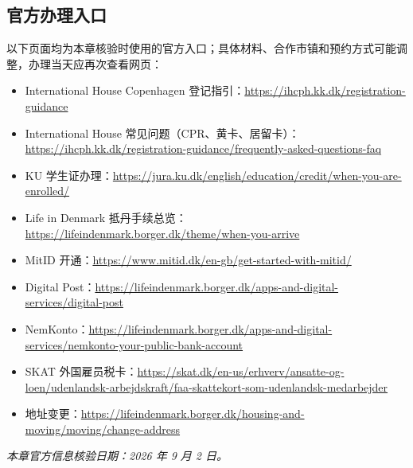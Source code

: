 \subsection{官方办理入口}

以下页面均为本章核验时使用的官方入口；具体材料、合作市镇和预约方式可能调整，办理当天应再次查看网页：

\begin{itemize}[leftmargin=2em,itemsep=2pt]
  \item International House Copenhagen 登记指引：\url{https://ihcph.kk.dk/registration-guidance}
  \item International House 常见问题（CPR、黄卡、居留卡）：\url{https://ihcph.kk.dk/registration-guidance/frequently-asked-questions-faq}
  \item KU 学生证办理：\url{https://jura.ku.dk/english/education/credit/when-you-are-enrolled/}
  \item Life in Denmark 抵丹手续总览：\url{https://lifeindenmark.borger.dk/theme/when-you-arrive}
  \item MitID 开通：\url{https://www.mitid.dk/en-gb/get-started-with-mitid/}
  \item Digital Post：\url{https://lifeindenmark.borger.dk/apps-and-digital-services/digital-post}
  \item NemKonto：\url{https://lifeindenmark.borger.dk/apps-and-digital-services/nemkonto-your-public-bank-account}
  \item SKAT 外国雇员税卡：\url{https://skat.dk/en-us/erhverv/ansatte-og-loen/udenlandsk-arbejdskraft/faa-skattekort-som-udenlandsk-medarbejder}
  \item 地址变更：\url{https://lifeindenmark.borger.dk/housing-and-moving/moving/change-address}
\end{itemize}

\noindent\textit{本章官方信息核验日期：2026 年 9 月 2 日。}
